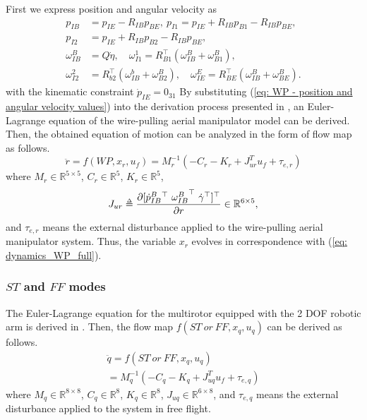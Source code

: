 \documentclass[letterpaper, 10 pt, conference]{ieeeconf}  %
\def\delequal{\mathrel{\ensurestackMath{\stackon[1pt]{=}{\scriptscriptstyle\Delta}}}}
\theoremstyle{definition}
\begin{document}
First we express position and angular velocity as 
\begin{equation} \label{eq: WP - position and angular velocity values}
    \begin{split}
        p_{I B} &= p_{I E} -R_{I B}p_{B E}, \ p_{I1} = p_{I E} + R_{I B}p_{B1} - R_{I B}p_{B E}, \\
        p_{I2} &= p_{I E} + R_{I B}p_{B 2} - R_{I B}p_{B E}, \\
        \omega^{B}_{I B} &= Q \dot{\eta}, \quad \omega^{1}_{I 1} = R_{B 1}^{\top}(\omega^{B}_{I B} + \omega^{B}_{B1}),\\
        \omega^{2}_{I2} &= R_{b2}^{\top}(\omega^{b}_{I B} + \omega^{B}_{B2}), \quad \omega^{E}_{IE} = R_{B E}^{\top}(\omega^{B}_{I B} + \omega^{B}_{B E}).
    \end{split} 
\end{equation}
with the kinematic constraint $\dot{p}_{I E} = 0_{31}$
By substituting (\ref{eq: WP - position and angular velocity values}) into the derivation process presented in \cite{kim2013aerial}, an Euler-Lagrange equation of the wire-pulling aerial manipulator model can be derived. Then, the obtained equation of motion can be analyzed in the form of flow map as follows.
\begin{equation}\label{eq: dynamics_WP_full}
    \ddot{r} = f(WP,x_r,u_f) = M^{-1}_r(- C_r - K_r + J_{u r}^{T}u_{f} + \tau_{e,r})
\end{equation}
where $M_r \in \mathbb{R}^{5 \times 5}$, $C_r \in \mathbb{R}^{5}$, $K_r \in \mathbb{R}^{5}$,
\begin{equation*}
    J_{u r} \delequal \frac{\partial [\dot{p}^{B}_{I B} {}^{\top} \ {\omega^B_{I B}}^{\top} \ \dot{\gamma}^{\top} ]^{\top}}{\partial r} \in \mathbb{R}^{6 \times 5},
\end{equation*}
{and $\tau_{e, r}$ means the external disturbance applied to the wire-pulling aerial manipulator system.} Thus, the variable $x_r$ evolves in correspondence with (\ref{eq: dynamics_WP_full}).

\subsubsection{$ST$ and $FF$ modes}
The Euler-Lagrange equation for the multirotor equipped with the 2 DOF robotic arm is derived in \cite{kim2013aerial}. Then, the flow map $f(ST \ or \ FF,x_q,u_q)$ can be derived as follows.
\begin{multline} \label{eq:dynamics of FF_full}
    \ddot{q} = f(ST \ or \ FF,x_q,u_q) \\= M_q^{-1}(- C_q - K_q + J_{u q}^{T}u_f + \tau_{e,q})
\end{multline}
where $M_q \in \mathbb{R}^{8 \times 8}$, $C_q \in \mathbb{R}^{8}$, $K_q \in \mathbb{R}^{8}$, $J_{u q} \in \mathbb{R}^{6 \times 8}$, and $\tau_{e, q}$ means the external disturbance applied to the system in free flight.
\end{document}
